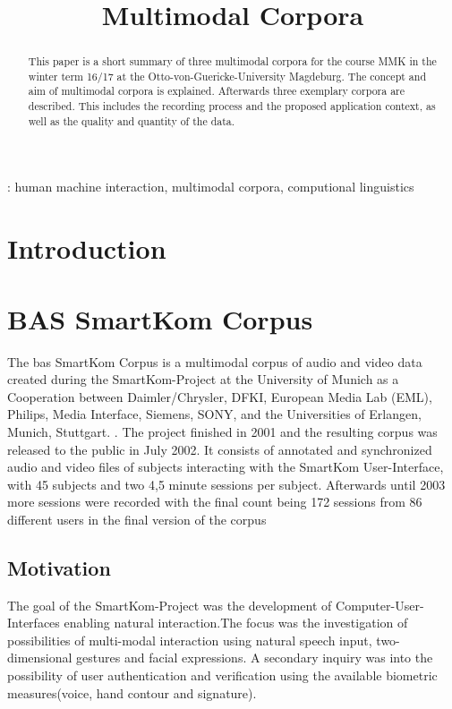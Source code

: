 \documentclass[a4paper]{article}
\title{Multimodal Corpora}
\begin{document}
	\maketitle
  	\begin{abstract}
    	This paper is a short summary of three multimodal corpora for the course MMK in the winter term 16/17 at the Otto-von-Guericke-University Magdeburg. The concept and aim of multimodal corpora is explained. Afterwards three exemplary corpora are described. This includes the recording process and the proposed application context, as well as the quality and quantity of the data.
  	\end{abstract}
  	: human machine interaction, multimodal corpora, computional linguistics
  	
	
  	\section{Introduction}


	\section{BAS SmartKom Corpus} 
		The \gls{bas} SmartKom Corpus is a multimodal corpus of audio and video data created during the SmartKom-Project at the University of Munich as a Cooperation between Daimler/Chrysler, DFKI, European Media Lab (EML), Philips, Media Interface, Siemens,	SONY, and the Universities of Erlangen, Munich, Stuttgart. \cite{schiel2002smartkom}. The project finished in 2001 and the resulting corpus was released to the public in July 2002. It consists of annotated and synchronized audio and video files of subjects interacting with the SmartKom User-Interface, with 45 subjects and two 4,5 minute sessions per subject. Afterwards until 2003 more sessions were recorded with the final count being 172 sessions from 86 different users in the final version of the corpus \cite{basSKP}
		\subsection{Motivation}
			 The goal of the SmartKom-Project  was the development of Computer-User-Interfaces enabling natural interaction.The focus was the investigation of possibilities of multi-modal interaction using natural speech input, two-dimensional gestures and facial expressions.
			 A secondary inquiry was into the possibility of user authentication and verification using the available biometric measures(voice, hand contour and signature).
				 
\end{document}
